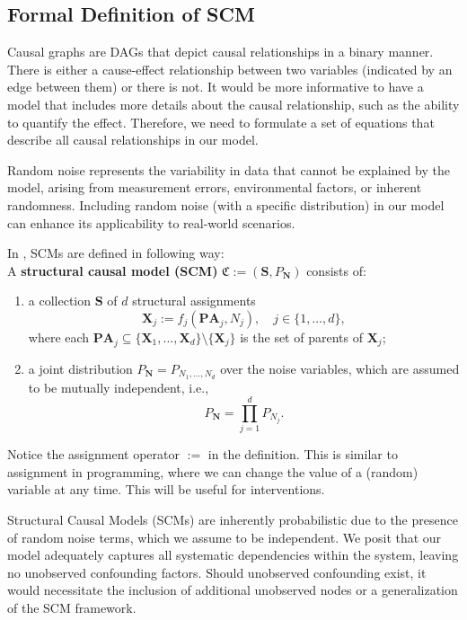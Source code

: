 \documentclass{article}
\newcommand{\X}{\mathbf{X}}
\newcommand{\C}{\mathfrak{C}}
\begin{document}
	\subsection{Formal Definition of SCM}
	
	Causal graphs are DAGs that depict causal relationships in a binary manner. There is either a cause-effect relationship between two variables (indicated by an edge between them) or there is not. It would be more informative to have a model that includes more details about the causal relationship, such as the ability to quantify the effect. Therefore, we need to formulate a set of equations that describe all causal relationships in our model. 
	
	Random noise represents the variability in data that cannot be explained by the model, arising from measurement errors, environmental factors, or inherent randomness. Including random noise (with a specific distribution) in our model can enhance its applicability to real-world scenarios.
	
	In \cite{peters2017}, SCMs are defined in following way: \\
	
	A \textbf{structural causal model (SCM)} $\C := (\mathbf{S}, P_\mathbf{N})$ consists of:
	\begin{enumerate}
		\item a collection $\mathbf{S}$ of $d$ structural assignments
		$$
		\X_j := f_j(\mathbf{PA}_j, N_j), \quad j \in \{1, \dots, d\},
		$$
		where each $\mathbf{PA}_j \subseteq \{\X_1, \dots, \X_d\} \setminus \{\X_j\}$ is the set of parents of $\X_j$;
		\item a joint distribution $P_\mathbf{N} = P_{N_1, \dots, N_d}$ over the noise variables, which are assumed to be mutually independent, i.e.,
		$$
		P_\mathbf{N} = \prod_{j=1}^d P_{N_j}.
		$$
	\end{enumerate}
	
	Notice the assignment operator $:=$ in the definition. This is similar to assignment in programming, where we can change the value of a (random) variable at any time. This will be useful for interventions.
	
	Structural Causal Models (SCMs) are inherently probabilistic due to the presence of random noise terms, which we assume to be independent. We posit that our model adequately captures all systematic dependencies within the system, leaving no unobserved confounding factors. Should unobserved confounding exist, it would necessitate the inclusion of additional unobserved nodes or a generalization of the SCM framework.
	
\end{document}
